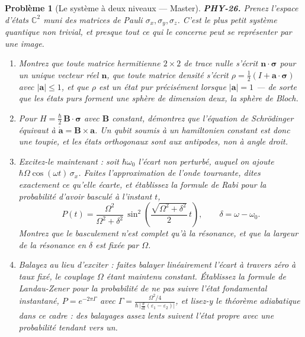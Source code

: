 \documentclass[11pt]{article}
\newtheorem{problem}{Problème}
\begin{document}
\bigskip

\begin{problem}[{Le système à deux niveaux --- Master}]
\textbf{PHY-26.} Prenez l'espace d'états $\mathbb{C}^2$ muni des matrices de Pauli
$\sigma_x, \sigma_y, \sigma_z$. C'est le plus petit système quantique non trivial, et presque
tout ce qui le concerne peut se représenter par une image.
\begin{enumerate}
\item[(a)] Montrez que toute matrice hermitienne $2\times 2$ de trace nulle s'écrit
$\mathbf{n}\cdot\boldsymbol{\sigma}$ pour un unique vecteur réel $\mathbf{n}$, que toute
matrice densité s'écrit $\rho = \tfrac12(I + \mathbf{a}\cdot\boldsymbol{\sigma})$ avec
$|\mathbf{a}| \le 1$, et que $\rho$ est un état pur précisément lorsque $|\mathbf{a}| = 1$
--- de sorte que les états purs forment une sphère de dimension deux, la sphère de Bloch.
\item[(b)] Pour $H = \tfrac{\hbar}{2}\,\mathbf{B}\cdot\boldsymbol{\sigma}$ avec $\mathbf{B}$
constant, démontrez que l'équation de Schrödinger équivaut à
$\dot{\mathbf{a}} = \mathbf{B}\times\mathbf{a}$. Un qubit soumis à un hamiltonien constant est
donc une toupie, et les états orthogonaux sont aux antipodes, non à angle droit.
\item[(c)] Excitez-le maintenant : soit $\hbar\omega_0$ l'écart non perturbé, auquel on ajoute
$\hbar\Omega\cos(\omega t)\,\sigma_x$. Faites l'approximation de l'onde tournante, dites
exactement ce qu'elle écarte, et établissez la formule de Rabi pour la probabilité d'avoir basculé
à l'instant $t$,
\[ P(t) = \frac{\Omega^2}{\Omega^2 + \delta^2}\,
\sin^2\!\left(\frac{\sqrt{\Omega^2+\delta^2}}{2}\,t\right), \qquad
\delta = \omega - \omega_0. \]
Montrez que le basculement n'est complet qu'à la résonance, et que la largeur de la résonance en
$\delta$ est fixée par $\Omega$.
\item[(d)] Balayez au lieu d'exciter : faites balayer linéairement l'écart à travers zéro à taux fixé, le
couplage $\Omega$ étant maintenu constant. Établissez la formule de Landau-Zener pour la
probabilité de ne pas suivre l'état fondamental instantané, $P = e^{-2\pi\Gamma}$ avec
$\Gamma = \frac{\Omega^2/4}{\hbar\,\bigl|\frac{d}{dt}(\varepsilon_1-\varepsilon_2)\bigr|}$,
et lisez-y le théorème adiabatique dans ce cadre : des balayages assez lents suivent l'état propre
avec une probabilité tendant vers un.
\end{enumerate}

\end{problem}
\end{document}
